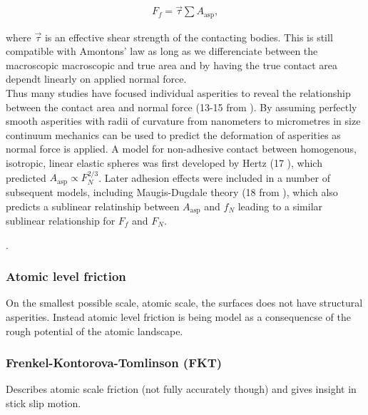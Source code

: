 \begin{align*}
  F_f = \vec{\tau} \sum A_{\text{asp}},
\end{align*}

where $\vec{\tau}$ is an effective shear strength of the contacting bodies. This is still compatible with Amontons’ law as long as we differenciate between the macroscopic macroscopic and true area and by having the true contact area dependt linearly on applied normal force. \\

Thus many studies have focused individual asperities to reveal the relationship between the contact area and normal force  (13-15 from \cite{mo_friction_2009}). By assuming perfectly smooth asperities with radii of curvature from nanometers to micrometres in size continuum mechanics can be used to predict the deformation of asperities as normal force is applied. A model for non-adhesive contact between homogenous, isotropic, linear elastic spheres was first developed by Hertz (17 \cite{mo_friction_2009}), which predicted $A_{\text{asp}} \propto F_N^{2/3}$. Later adhesion effects were included in a number of subsequent models, including Maugis-Dugdale theory (18 from \cite{mo_friction_2009}), which also predicts a sublinear relatinship between $A_{\text{asp}}$ and $f_N$ leading to a similar sublinear relationship for $F_f$ and $F_N$.

\cite{mo_friction_2009}.




\subsubsection{Atomic level friction }
On the smallest possible scale, atomic scale, the surfaces does not have structural asperities. Instead atomic level friction is being model as a consequencse of the rough potential of the atomic landscape. 

\subsubsection{Frenkel-Kontorova-Tomlinson (FKT)}
Describes atomic scale friction (not fully accurately though) and gives insight in stick slip motion. 



